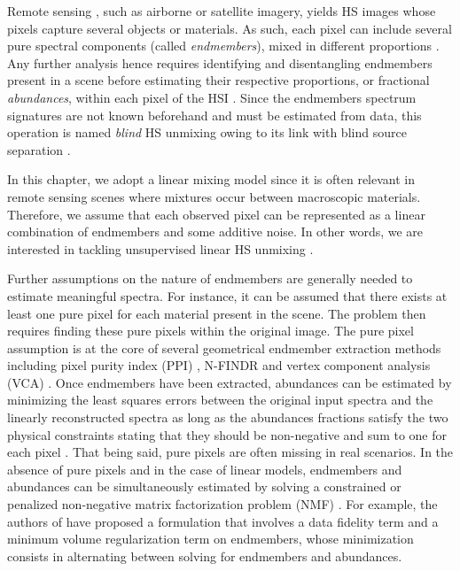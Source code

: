 Remote sensing \cite{clark_imaging_2003, bioucas-dias_hyperspectral_2013}, such as airborne or satellite imagery, yields HS images whose pixels capture several objects or materials.
As such, each pixel can include several pure spectral components (called \emph{endmembers}), mixed in different proportions \cite{ghamisi_advances_2017}.
Any further analysis hence requires identifying and disentangling endmembers present in a scene before estimating their respective proportions, or fractional \emph{abundances}, within each pixel of the HSI \cite{parra_unmixing_1999}.
Since the endmembers spectrum signatures are not known beforehand and must be estimated from data, this operation is named \emph{blind} HS unmixing \cite{keshava_spectral_2002, bioucas-dias_hyperspectral_2012} owing to its link with blind source separation \cite{comon_handbook_2010}.

In this chapter, we adopt a linear mixing model since it is often relevant in remote sensing scenes where mixtures occur between macroscopic materials.
Therefore, we assume that each observed pixel can be represented as a linear combination of endmembers and some additive noise.
In other words, we are interested in tackling unsupervised linear HS unmixing \cite{parra_unmixing_1999}.

Further assumptions on the nature of endmembers are generally needed to estimate meaningful spectra.
For instance, it can be assumed that there exists at least one pure pixel for each material present in the scene.
The problem then requires finding these pure pixels within the original image.
The pure pixel assumption is at the core of several geometrical endmember extraction methods including pixel purity index (PPI) \cite{boardman_mapping_1995}, N-FINDR \cite{winter_n-findr_1999} and vertex component analysis (VCA) \cite{nascimento_vertex_2005}.
Once endmembers have been extracted, abundances can be estimated by minimizing the least squares errors between the original input spectra and the linearly reconstructed spectra as long as the abundances fractions satisfy the two physical constraints stating that they should be non-negative and sum to one for each pixel \cite{heinz_fully_2001}. 
That being said, pure pixels are often missing in real scenarios.
In the absence of pure pixels and in the case of linear models, endmembers and abundances can be simultaneously estimated by solving a constrained or penalized non-negative matrix factorization problem (NMF) \cite{lee_algorithms_2000}.
For example, the authors of \cite{zhuang_regularization_2019} have proposed a formulation that involves a data fidelity term and a minimum volume regularization term on endmembers, whose minimization consists in alternating between solving for endmembers and abundances.

